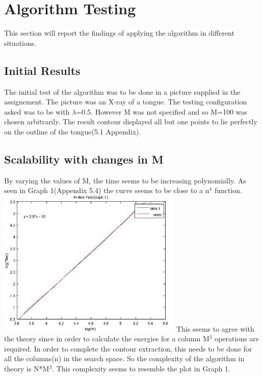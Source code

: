 \documentclass[12pt,a4paper,twocolumn]{article}
\begin{document}
\section{Algorithm Testing}
This section will report the findings of applying the algorithm in different situations.
\subsection{Initial Results}
The initial test of the algorithm was to be done in a picture supplied in the assignement. The picture was an X-ray of a tongue. The testing configuration asked was to be with $\lambda$=0.5. However M was not specified and so M=100 was chosen arbitrarily. The result contour displayed all but one points to lie perfectly on the outline of the tongue(5.1 Appendix).
\subsection{Scalability with changes in M}
By varying the values of M, the time seems to be increasing polynomially. As seen in Graph 1(Appendix 5.4) the curve seems to be close to a n$^4$ function. 
\includegraphics[width=250pt,height=200pt,scale=1]{logs.jpg}	
This seems to agree with the theory since in order to calculate the energies for a column M$^3$ operations are required. In order to complete the contour extraction, this needs to be done for all the columns(n) in the search space. So the complexity of the algorithm in theory is N*M$^3$. This complexity seems to resemble the plot in Graph 1.
\end{document}
